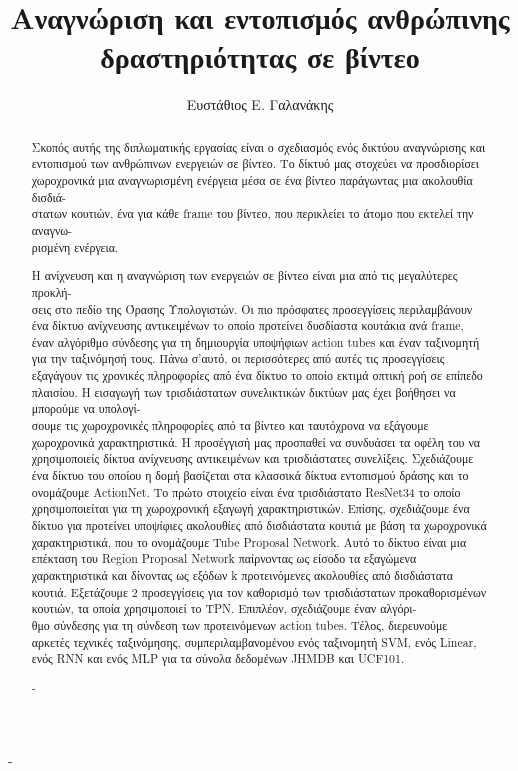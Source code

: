 \documentclass[10pt, twoside, a4paper]{cvsp-thesis}
\title{Αναγνώριση και εντοπισμός ανθρώπινης δραστηριότητας σε βίντεο}
\author{Ευστάθιος Ε. Γαλανάκης}
\begin{document}
\frontmatter

\maketitle

\begin{acknowledgements}
-
\end{acknowledgements}

\begin{abstract}

Σκοπός αυτής της διπλωματικής εργασίας είναι ο σχεδιασμός ενός δικτύου αναγνώρισης
και εντοπισμού των ανθρώπινων ενεργειών σε βίντεο. Το δίκτυό μας στοχεύει να προσδιορίσει χωροχρονικά
μια αναγνωρισμένη ενέργεια μέσα σε ένα βίντεο παράγωντας μια ακολουθία δισδιά-\\
στατων  κουτιών, ένα για κάθε frame  του βίντεο, που περικλείει το άτομο που εκτελεί την αναγνω-\\
ρισμένη ενέργεια. \par

Η ανίχνευση και η αναγνώριση των ενεργειών σε βίντεο είναι μια από τις μεγαλύτερες προκλή-\\
σεις στο πεδίο της Όρασης Υπολογιστών. Οι πιο πρόσφατες προσεγγίσεις περιλαμβάνουν ένα δίκτυο ανίχνευσης αντικειμένων
τo οποίο προτείνει δυσδίαστα κουτάκια ανά  frame, έναν αλγόριθμο σύνδεσης για τη δημιουργία
υποψήφιων  action tubes  και έναν ταξινομητή για την ταξινόμησή τους. Πάνω σ'αυτό, οι  περισσότερες
από αυτές τις προσεγγίσεις εξαγάγουν τις χρονικές πληροφορίες από ένα δίκτυο το οποίο εκτιμά
οπτική ροή σε επίπεδο πλαισίου. Η εισαγωγή των τρισδιάστατων συνελικτικών δικτύων 
μας έχει βοήθησει να μπορούμε να υπολογί-\\
σουμε τις χωροχρονικές πληροφορίες από τα βίντεο και ταυτόχρονα να εξάγουμε χωροχρονικά χαρακτηριστικά. Η προσέγγισή μας προσπαθεί να συνδυάσει τα οφέλη
του να χρησιμοποιείς δίκτυα ανίχνευσης αντικειμένων και τρισδιάστατες συνελίξεις.
Σχεδιάζουμε ένα δίκτυο του οποίου η δομή βασίζεται στα κλασσικά δίκτυα  εντοπισμού  δράσης
 και το ονομάζουμε ActionNet. Το πρώτο στοιχείο είναι ένα τρισδιάστατο  ResNet34   το οποίο
χρησιμοποιείται για τη χωροχρονική εξαγωγή χαρακτηριστικών. Επίσης, σχεδιάζουμε ένα δίκτυο για
προτείνει υποψίφιες ακολουθίες από δισδιάστατα κουτιά με βάση τα χωροχρονικά χαρακτηριστικά, που το ονομάζουμε
 Tube Proposal Network. Αυτό το δίκτυο είναι μια επέκταση του Region Proposal Network  παίρνοντας ως είσοδο
τα εξαγώμενα χαρακτηριστικά και δίνοντας ως εξόδων k προτεινόμενες ακολουθίες από δισδιάστατα κουτιά. Εξετάζουμε
2 προσεγγίσεις για τον καθορισμό των τρισδιάστατων προκαθορισμένων κουτιών, τα  οποία χρησιμοποιεί το  TPN. Επιπλέον, σχεδιάζουμε
έναν αλγόρι-\\
θμο σύνδεσης για τη σύνδεση των προτεινόμενων  action tubes. Τέλος, διερευνούμε 
αρκετές τεχνικές ταξινόμησης, συμπεριλαμβανομένου ενός ταξινομητή  SVM, ενός Linear, ενός  RNN  και ενός  MLP  για τα σύνολα δεδομένων
 JHMDB  και UCF101.
\begin{keywords}
-
\end{keywords}
\end{abstract}
\end{document}
